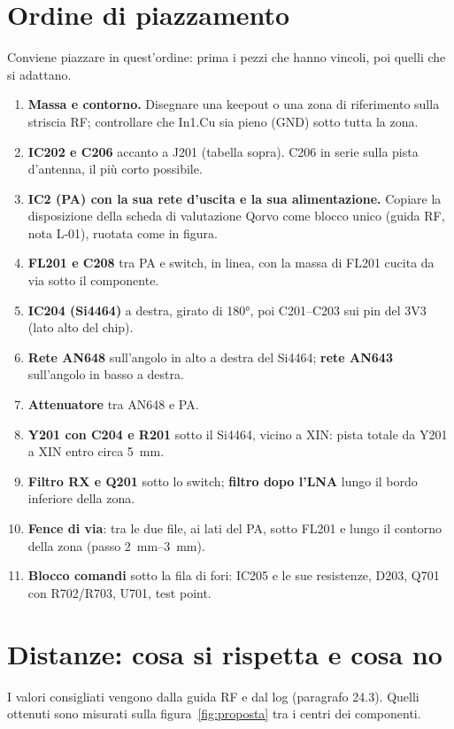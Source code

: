 \documentclass[a4paper,11pt]{article}
\begin{document}
\section{Ordine di piazzamento}
Conviene piazzare in quest'ordine: prima i pezzi che hanno vincoli, poi quelli che si adattano.
\begin{enumerate}
\item \textbf{Massa e contorno.} Disegnare una keepout o una zona di riferimento sulla striscia RF; controllare che In1.Cu sia pieno (GND) sotto tutta la zona.
\item \textbf{IC202 e C206} accanto a J201 (tabella sopra). C206 in serie sulla pista d'antenna, il più corto possibile.
\item \textbf{IC2 (PA) con la sua rete d'uscita e la sua alimentazione.} Copiare la disposizione della scheda di valutazione Qorvo come blocco unico (guida RF, nota L-01), ruotata come in figura.
\item \textbf{FL201 e C208} tra PA e switch, in linea, con la massa di FL201 cucita da via sotto il componente.
\item \textbf{IC204 (Si4464)} a destra, girato di \ang{180}, poi C201--C203 sui pin del 3V3 (lato alto del chip).
\item \textbf{Rete AN648} sull'angolo in alto a destra del Si4464; \textbf{rete AN643} sull'angolo in basso a destra.
\item \textbf{Attenuatore} tra AN648 e PA.
\item \textbf{Y201 con C204 e R201} sotto il Si4464, vicino a XIN: pista totale da Y201 a XIN entro circa \SI{5}{mm}.
\item \textbf{Filtro RX e Q201} sotto lo switch; \textbf{filtro dopo l'LNA} lungo il bordo inferiore della zona.
\item \textbf{Fence di via}: tra le due file, ai lati del PA, sotto FL201 e lungo il contorno della zona (passo \SIrange{2}{3}{mm}).
\item \textbf{Blocco comandi} sotto la fila di fori: IC205 e le sue resistenze, D203, Q701 con R702/R703, U701, test point.
\end{enumerate}

\section{Distanze: cosa si rispetta e cosa no}
\label{sec:distanze}
I valori consigliati vengono dalla guida RF e dal log (paragrafo 24.3). Quelli ottenuti sono misurati sulla figura~\ref{fig:proposta} tra i centri dei componenti.
\end{document}
